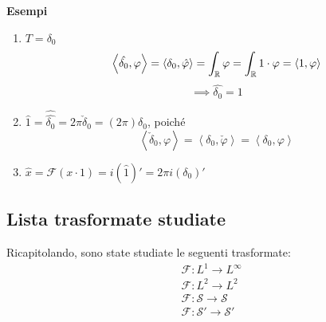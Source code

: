 \textbf{Esempi} 
\begin{enumerate}
	\item $T=\delta_0$ 
		\[\left< \hat{\delta_0},\varphi \right> =\left< \delta_0,\hat{\varphi} \right> = \int_{\mathbb{R}}^{} \varphi=\int_{\mathbb{R}}^{} 1\cdot \varphi=\left< 1,\varphi \right>  \]
		\[\implies \hat{\delta_0}=1\]
	\item $\hat{1}=\hat{\hat{\delta_0}}=2\pi\check\delta_0=(2\pi)\delta_0$, poiché
		\[\left<   \check\delta_0,\varphi \right>= \left< \delta_0,\check\varphi \right> =\left< \delta_0,\varphi \right> \]

	\item $\hat{x}=\mathcal F(x\cdot 1)=i(\hat{1})'=2\pi i(\delta_0)'$

\end{enumerate}
\subsection{Lista trasformate studiate}
Ricapitolando, sono state studiate le seguenti trasformate:
\begin{align*}
&\mathcal F: L^1\to L^\infty\\&\mathcal F: L^2\to L^2	
\\ &\mathcal F: \mathcal S\to \mathcal S
\\ &\mathcal F: \mathcal S'\to \mathcal S'
\end{align*}
